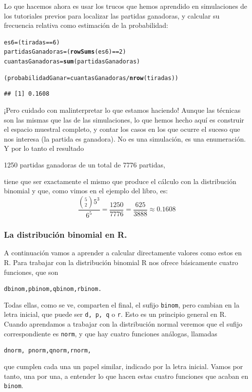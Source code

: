 \documentclass[10pt,a4paper]{article}\usepackage[]{graphicx}\usepackage[]{color}
\makeatletter
\newcommand{\hlnum}[1]{\textcolor[rgb]{0.686,0.059,0.569}{#1}}%
\newcommand{\hlopt}[1]{\textcolor[rgb]{0,0,0}{#1}}%
\newcommand{\hlstd}[1]{\textcolor[rgb]{0.345,0.345,0.345}{#1}}%
\newcommand{\hlkwb}[1]{\textcolor[rgb]{0.69,0.353,0.396}{#1}}%
\newcommand{\hlkwd}[1]{\textcolor[rgb]{0.737,0.353,0.396}{\textbf{#1}}}%
\newenvironment{kframe}{%
 \def\at@end@of@kframe{}%
 \ifinner\ifhmode%
  \def\at@end@of@kframe{\end{minipage}}%
  \begin{minipage}{\columnwidth}%
 \fi\fi%
 \def\FrameCommand##1{\hskip\@totalleftmargin \hskip-\fboxsep
 \colorbox{shadecolor}{##1}\hskip-\fboxsep
     \hskip-\linewidth \hskip-\@totalleftmargin \hskip\columnwidth}%
 \MakeFramed {\advance\hsize-\width
   \@totalleftmargin\z@ \linewidth\hsize
   \@setminipage}}%
 {\par\unskip\endMakeFramed%
 \at@end@of@kframe}
\newenvironment{knitrout}{}{} %
\newcounter{cont01}
\makeatother
\begin{document}
Lo que hacemos ahora es usar los trucos que hemos aprendido en simulaciones de los tutoriales previos para localizar las partidas ganadoras, y calcular su frecuencia relativa como estimación de la probabilidad:
\begin{knitrout}
\color{fgcolor}\begin{kframe}
\begin{alltt}
\hlstd{es6} \hlkwb{=} \hlstd{(tiradas}\hlopt{==}\hlnum{6}\hlstd{)}
\hlstd{partidasGanadoras} \hlkwb{=} \hlstd{(}\hlkwd{rowSums}\hlstd{(es6)} \hlopt{==} \hlnum{2}\hlstd{)}
\hlstd{cuantasGanadoras} \hlkwb{=} \hlkwd{sum}\hlstd{(partidasGanadoras)}

\hlstd{(probabilidadGanar} \hlkwb{=} \hlstd{cuantasGanadoras} \hlopt{/} \hlkwd{nrow}\hlstd{(tiradas))}
\end{alltt}
\begin{verbatim}
## [1] 0.1608
\end{verbatim}
\end{kframe}
\end{knitrout}

¡Pero cuidado con malinterpretar lo que estamos haciendo! Aunque las técnicas son las mismas que las de las simulaciones, lo que hemos hecho aquí es construir el espacio muestral completo, y contar los casos en los que ocurre el suceso que nos interesa (la partida es ganadora). No es una simulación, es una {\sf enumeración}. Y por lo tanto el resultado

1250 partidas ganadoras de un total de 7776 partidas,

tiene que ser exactamente el mismo que produce el cálculo con la distribución binomial y que, como vimos en el ejemplo del libro, es:
\[\dfrac{\displaystyle\binom{5}{2}5^3}{6^5}=\dfrac{1250}{7776} = \dfrac{625}{3888}\approx 0.1608\]

\subsubsection{La distribución binomial en R.}

A continuación vamos a aprender a calcular directamente valores como estos en R. Para trabajar con la distribución binomial R nos ofrece básicamente cuatro funciones, que son
    \begin{center}
    {\tt    dbinom,\qquad     pbinom,\qquad     qbinom,\qquad     rbinom.}
    \end{center}
Todas ellas, como se ve, comparten el final, el sufijo {\tt binom}, pero cambian en la letra inicial, que puede ser {\tt d, p, q} o {\tt r}. Esto es un principio general en R. Cuando aprendamos a trabajar con la distribución normal veremos que el sufijo correspondiente es {\tt norm}, y que hay cuatro funciones análogas, llamadas
    \begin{center}
    {\tt     dnorm, \qquad     pnorm,\qquad     qnorm,\qquad     rnorm,}
    \end{center}
que cumplen cada una un papel similar, indicado por la letra inicial. Vamos por tanto, una por una, a entender lo que hacen estas cuatro funciones que acaban en {\tt binom}.
\end{document}
